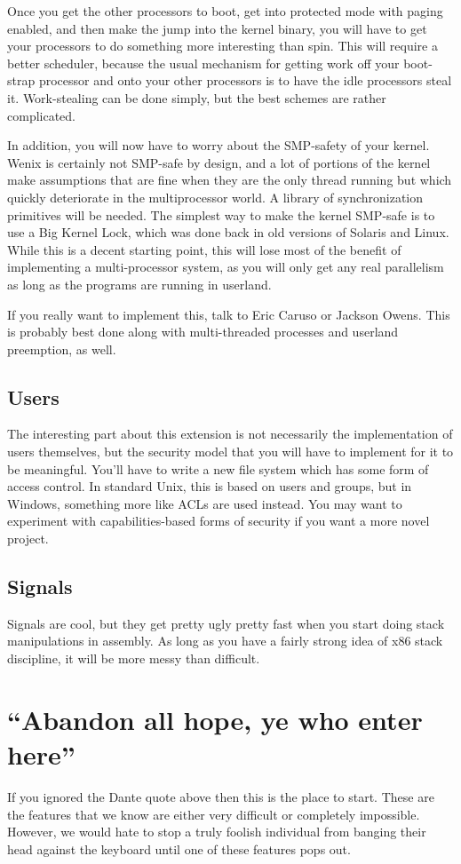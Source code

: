 Once you get the other processors to boot, get into protected mode with paging enabled, and then make the jump into the kernel binary, you will have to get your processors to do something more interesting than spin. This will require a better scheduler, because the usual mechanism for getting work off your boot-strap processor and onto your other processors is to have the idle processors steal it. Work-stealing can be done simply, but the best schemes are rather complicated.

In addition, you will now have to worry about the SMP-safety of your kernel. Wenix is certainly not SMP-safe by design, and a lot of portions of the kernel make assumptions that are fine when they are the only thread running but which quickly deteriorate in the multiprocessor world. A library of synchronization primitives will be needed. The simplest way to make the kernel SMP-safe is to use a Big Kernel Lock, which was done back in old versions of Solaris and Linux. While this is a decent starting point, this will lose most of the benefit of implementing a multi-processor system, as you will only get any real parallelism as long as the programs are running in userland.

If you really want to implement this, talk to Eric Caruso or Jackson Owens. This is probably best done along with multi-threaded processes and userland preemption, as well.
\subsection{Users}
The interesting part about this extension is not necessarily the implementation of users themselves, but the security model that you will have to implement for it to be meaningful. You'll have to write a new file system which has some form of access control. In standard Unix, this is based on users and groups, but in Windows, something more like ACLs are used instead. You may want to experiment with capabilities-based forms of security if you want a more novel project.
\subsection{Signals}
Signals are cool, but they get pretty ugly pretty fast when you start doing stack manipulations in assembly. As long as you have a fairly strong idea of x86 stack discipline, it will be more messy than difficult.

\section{``Abandon all hope, ye who enter here''}
If you ignored the Dante quote above then this is the place to start. These are the features that we know are either very difficult or completely impossible. However, we would hate to stop a truly foolish individual from banging their head against the keyboard until one of these features pops out.

